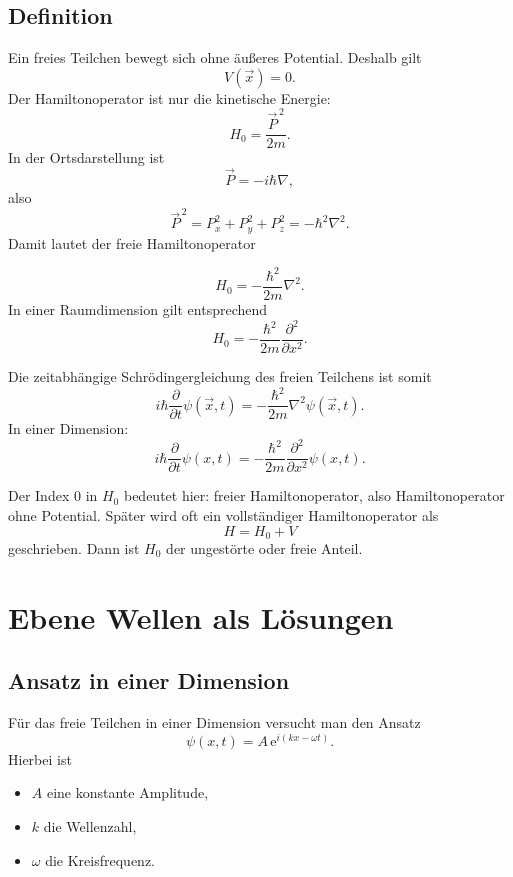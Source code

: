 \subsection{Definition}

Ein freies Teilchen bewegt sich ohne äußeres Potential. Deshalb gilt
\[
    V(\vec{x})=0.
\]
Der Hamiltonoperator ist nur die kinetische Energie:
\[
    H_0=\frac{\vec{P}^{\,2}}{2m}.
\]
In der Ortsdarstellung ist
\[
    \vec{P}=-i\hbar\nabla,
\]
also
\[
    \vec{P}^{\,2}=P_x^2+P_y^2+P_z^2=-\hbar^2\nabla^2.
\]
Damit lautet der freie Hamiltonoperator
\begin{formulabox}
\[
    H_0=-\frac{\hbar^2}{2m}\nabla^2.
\]
In einer Raumdimension gilt entsprechend
\[
    H_0=-\frac{\hbar^2}{2m}\frac{\partial^2}{\partial x^2}.
\]
\end{formulabox}

Die zeitabhängige Schrödingergleichung des freien Teilchens ist somit
\[
    i\hbar\frac{\partial}{\partial t}\psi(\vec{x},t)
    =-\frac{\hbar^2}{2m}\nabla^2\psi(\vec{x},t).
\]
In einer Dimension:
\[
    i\hbar\frac{\partial}{\partial t}\psi(x,t)
    =-\frac{\hbar^2}{2m}\frac{\partial^2}{\partial x^2}\psi(x,t).
\]

\begin{notebox}
Der Index $0$ in $H_0$ bedeutet hier: freier Hamiltonoperator, also Hamiltonoperator ohne Potential. Später wird oft ein vollständiger Hamiltonoperator als
\[
    H=H_0+V
\]
geschrieben. Dann ist $H_0$ der ungestörte oder freie Anteil.
\end{notebox}

\section{Ebene Wellen als Lösungen}

\subsection{Ansatz in einer Dimension}

Für das freie Teilchen in einer Dimension versucht man den Ansatz
\[
    \psi(x,t)=A\,\mathrm{e}^{i(kx-\omega t)}.
\]
Hierbei ist
\begin{itemize}
    \item $A$ eine konstante Amplitude,
    \item $k$ die Wellenzahl,
    \item $\omega$ die Kreisfrequenz.
\end{itemize}


